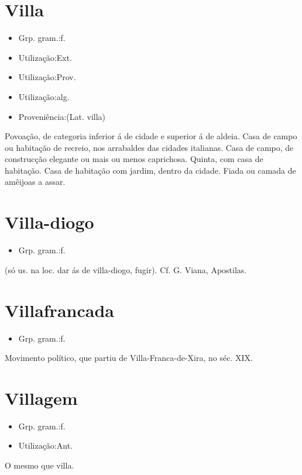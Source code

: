 \documentclass{article}
\begin{document}
\section{Villa}
\begin{itemize}
\item {Grp. gram.:f.}
\end{itemize}
\begin{itemize}
\item {Utilização:Ext.}
\end{itemize}
\begin{itemize}
\item {Utilização:Prov.}
\end{itemize}
\begin{itemize}
\item {Utilização:alg.}
\end{itemize}
\begin{itemize}
\item {Proveniência:(Lat. \textunderscore villa\textunderscore )}
\end{itemize}
Povoação, de categoria inferior á de cidade e superior á de aldeia.
Casa de campo ou habitação de recreio, nos arrabaldes das cidades italianas.
Casa de campo, de construcção elegante ou mais ou menos caprichosa.
Quinta, com casa de habitação.
Casa de habitação com jardim, dentro da cidade.
Fiada ou camada de amêijoas a assar.
\section{Villa-diogo}
\begin{itemize}
\item {Grp. gram.:f.}
\end{itemize}
(só us. na loc. \textunderscore dar ás de villa-diogo\textunderscore , fugir). Cf. G. Viana, \textunderscore Apostilas\textunderscore .
\section{Villafrancada}
\begin{itemize}
\item {Grp. gram.:f.}
\end{itemize}
Movimento político, que partiu de Villa-Franca-de-Xira, no séc. XIX.
\section{Villagem}
\begin{itemize}
\item {Grp. gram.:f.}
\end{itemize}
\begin{itemize}
\item {Utilização:Ant.}
\end{itemize}
O mesmo que \textunderscore villa\textunderscore .
\end{document}
